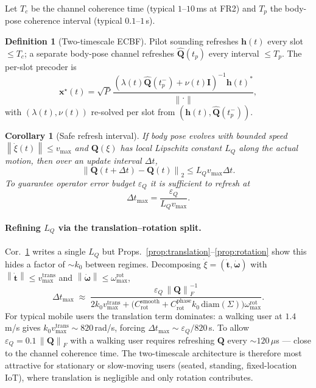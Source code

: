 \documentclass[11pt,a4paper]{article}
\newtheorem{corollary}[theorem]{Corollary}
\theoremstyle{definition}
\newtheorem{definition}[theorem]{Definition}
\newcommand{\xx}{\mathbf{x}}
\newcommand{\hh}{\mathbf{h}}
\newcommand{\Q}{\mathbf{Q}}
\newcommand{\Qhat}{\widehat{\mathbf{Q}}}
\newcommand{\Sigmaset}{\Sigma}
\newcommand{\norm}[1]{\left\lVert #1 \right\rVert}
\begin{document}
Let $T_c$ be the channel coherence time (typical $1$--$10$\,ms at FR2)
and $T_p$ the body-pose coherence interval (typical $0.1$--$1$\,s).

\begin{definition}[Two-timescale ECBF]
\label{def:two-timescale}
Pilot sounding refreshes $\hh(t)$ every slot $\le T_c$; a separate
body-pose channel refreshes $\Qhat(t_p)$ every interval $\le T_p$. The
per-slot precoder is
\[
  \xx^\star(t) = \sqrt{P}\,
  \frac{(\lambda(t)\Qhat(t_p^-) + \nu(t)\mathbf{I})^{-1}\hh(t)^*}{\norm{\cdot}},
\]
with $(\lambda(t),\nu(t))$ re-solved per slot from
$(\hh(t),\Qhat(t_p^-))$.
\end{definition}

\begin{corollary}[Safe refresh interval]
\label{cor:refresh}
If body pose evolves with bounded speed $\norm{\dot\xi(t)}\le v_{\max}$
and $\Q(\xi)$ has local Lipschitz constant $L_Q$ along the actual
motion, then over an update interval $\Delta t$,
\[
  \norm{\Q(t+\Delta t)-\Q(t)}_2 \le L_Q v_{\max}\Delta t.
\]
To guarantee operator error budget $\varepsilon_Q$ it is sufficient to
refresh at
\begin{equation}
  \Delta t_{\max} = \frac{\varepsilon_Q}{L_Q v_{\max}}.
  \label{eq:dt-max}
\end{equation}
\end{corollary}

\paragraph{Refining $L_Q$ via the translation--rotation split.}
Cor.~\ref{cor:refresh} writes a single $L_Q$ but
Props.~\ref{prop:translation}--\ref{prop:rotation} show this hides a
factor of $\sim\!k_0$ between regimes. Decomposing $\dot\xi=(\dot{\mathbf{t}},\dot{\boldsymbol\omega})$
with $\norm{\dot{\mathbf{t}}}\le v_{\max}^{\mathrm{trans}}$ and
$\norm{\dot{\boldsymbol\omega}}\le \omega_{\max}^{\mathrm{rot}}$,
\begin{equation}
  \Delta t_{\max} \;\approx\;
  \frac{\varepsilon_Q\,\norm{\Q}_F^{-1}}
       {2 k_0 v_{\max}^{\mathrm{trans}}
        + \bigl(C_{\mathrm{rot}}^{\mathrm{smooth}}+
                C_{\mathrm{rot}}^{\mathrm{phase}} k_0\,\mathrm{diam}(\Sigmaset)\bigr)
        \omega_{\max}^{\mathrm{rot}}}.
  \label{eq:dt-refined}
\end{equation}
For typical mobile users the translation term dominates: a walking
user at $1.4$\,m/s gives $k_0 v_{\max}^{\mathrm{trans}}\!\sim\!820$\,rad/s,
forcing $\Delta t_{\max} \!\sim\! \varepsilon_Q / 820$\,s. To allow
$\varepsilon_Q\!=\!0.1\,\norm{\Q}_F$ with a walking user requires
refreshing $\Q$ every $\sim\!120$\,$\mu$s --- close to the channel
coherence time. The two-timescale architecture is therefore most
attractive for stationary or slow-moving users (seated, standing,
fixed-location IoT), where translation is negligible and only rotation
contributes.
\end{document}
